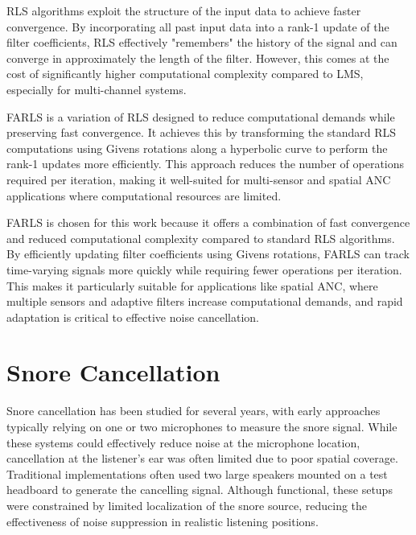 RLS algorithms exploit the structure of the input data to achieve faster convergence. By incorporating all past input data into a rank-1 update of the filter coefficients, RLS effectively "remembers" the history of the signal and can converge in approximately the length of the filter. However, this comes at the cost of significantly higher computational complexity compared to LMS, especially for multi-channel systems\cite{adp_fit_comp}.

FARLS is a variation of RLS designed to reduce computational demands while preserving fast convergence. It achieves this by transforming the standard RLS computations using Givens rotations along a hyperbolic curve to perform the rank-1 updates more efficiently. This approach reduces the number of operations required per iteration, making it well-suited for multi-sensor and spatial ANC applications where computational resources are limited.

FARLS is chosen for this work because it offers a combination of fast convergence and reduced computational complexity compared to standard RLS algorithms\cite{FARLS_EQ}. By efficiently updating filter coefficients using Givens rotations, FARLS can track time-varying signals more quickly while requiring fewer operations per iteration. This makes it particularly suitable for applications like spatial ANC, where multiple sensors and adaptive filters increase computational demands, and rapid adaptation is critical to effective noise cancellation.

\section{Snore Cancellation}

Snore cancellation has been studied for several years, with early approaches typically relying on one or two microphones to measure the snore signal. While these systems could effectively reduce noise at the microphone location, cancellation at the listener's ear was often limited due to poor spatial coverage\cite{Ear_field_ANC}\cite{Applied_ANC}\cite{RT_exp_ANC}\cite{subband_implementation}\cite{Online_secondary_path}\cite{Snore_detection_cancel}\cite{DSP_processor_snore}\cite{Joint_ANC}. Traditional implementations often used two large speakers mounted on a test headboard to generate the cancelling signal. Although functional, these setups were constrained by limited localization of the snore source, reducing the effectiveness of noise suppression in realistic listening positions.

